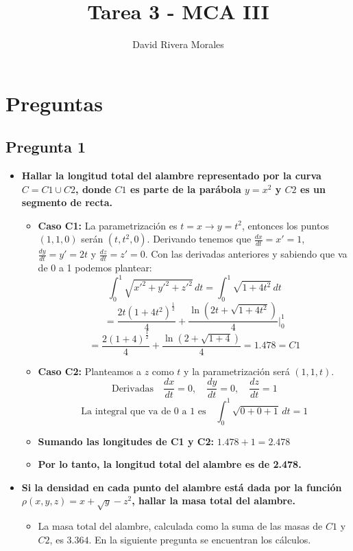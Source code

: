 \documentclass{article}
\title{Tarea 3 - MCA III}
\author{David Rivera Morales}
\date{}
\begin{document}
\maketitle

\section*{Preguntas}

\subsection*{Pregunta 1}
\begin{itemize}
    \item \textbf{Hallar la longitud total del alambre representado por la curva \( C = C1 \cup C2 \), donde \( C1 \) es parte de la parábola \( y = x^2 \) y \( C2 \) es un segmento de recta.}
    \begin{itemize}
        \item \textbf{Caso C1:} La parametrización es \( t = x \to y = t^2 \), entonces los puntos \((1, 1, 0)\) serán \( (t, t^2, 0) \). Derivando tenemos que \(\frac{dx}{dt} = x' = 1 \), \(\frac{dy}{dt} = y' = 2t \) y \(\frac{dz}{dt} = z' = 0 \). Con las derivadas anteriores y sabiendo que va de 0 a 1 podemos plantear:
        \[
        \int_{0}^{1} \sqrt{x'^{2} + y'^{2} + z'^{2}} \, dt = \int_{0}^{1} \sqrt{1 + 4t^{2}} \, dt
        \]
        \[
        = \frac{2t (1 + 4t^{2})^{\frac{1}{2}}}{4} + \frac{\ln \left(2t + \sqrt{1 + 4t^{2}}\right)}{4} \Big|_{0}^{1} 
        \]
        \[
        = \frac{2(1 + 4)^{\frac{1}{2}}}{4} + \frac{\ln \left(2 + \sqrt{1 + 4}\right)}{4} = 1.478 = C1
        \]
        
        \item \textbf{Caso C2:} Planteamos a \( z \) como \( t \) y la parametrización será \( (1,1,t) \).
        \[
        \text{Derivadas} \quad \frac{dx}{dt} = 0, \quad \frac{dy}{dt} = 0, \quad \frac{dz}{dt} = 1
        \]
        \[
        \text{La integral que va de 0 a 1 es} \quad \int_{0}^{1} \sqrt{0 + 0 + 1} \, dt = 1
        \]

        \item \textbf{Sumando las longitudes de C1 y C2:} \quad \( 1.478 + 1 = 2.478 \)

        \item \textbf{Por lo tanto, la longitud total del alambre es de 2.478.}
    \end{itemize}

    \item \textbf{Si la densidad en cada punto del alambre está dada por la función \( \rho(x, y, z) = x + \sqrt{y} - z^2 \), hallar la masa total del alambre.}
     \begin{itemize}
        \item La masa total del alambre, calculada como la suma de las masas de \( C1 \) y \( C2 \), es \( 3.364 \). En la siguiente pregunta se encuentran los cálculos.
    \end{itemize}
    

\end{itemize}
\end{document}
